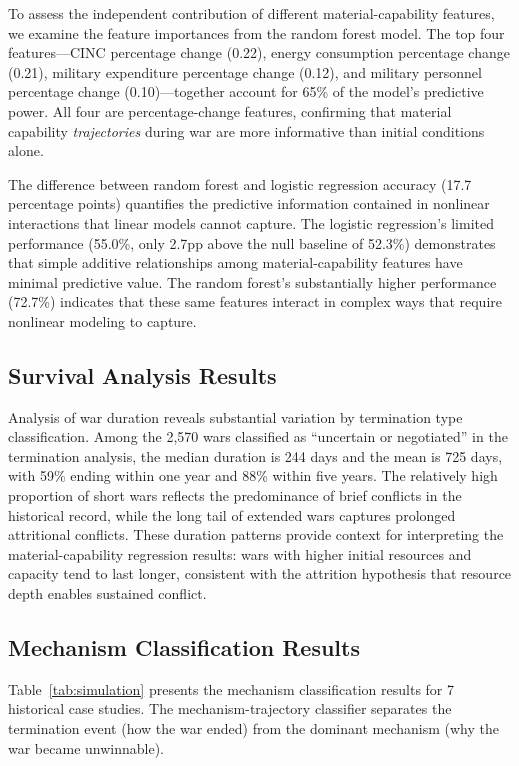 To assess the independent contribution of different material-capability features, we examine the feature importances from the random forest model. The top four features---CINC percentage change (0.22), energy consumption percentage change (0.21), military expenditure percentage change (0.12), and military personnel percentage change (0.10)---together account for 65\% of the model's predictive power. All four are percentage-change features, confirming that material capability \emph{trajectories} during war are more informative than initial conditions alone.

The difference between random forest and logistic regression accuracy (17.7 percentage points) quantifies the predictive information contained in nonlinear interactions that linear models cannot capture. The logistic regression's limited performance (55.0\%, only 2.7pp above the null baseline of 52.3\%) demonstrates that simple additive relationships among material-capability features have minimal predictive value. The random forest's substantially higher performance (72.7\%) indicates that these same features interact in complex ways that require nonlinear modeling to capture.

\subsection{Survival Analysis Results}

Analysis of war duration reveals substantial variation by termination type classification. Among the 2,570 wars classified as ``uncertain or negotiated'' in the termination analysis, the median duration is 244 days and the mean is 725 days, with 59\% ending within one year and 88\% within five years. The relatively high proportion of short wars reflects the predominance of brief conflicts in the historical record, while the long tail of extended wars captures prolonged attritional conflicts. These duration patterns provide context for interpreting the material-capability regression results: wars with higher initial resources and capacity tend to last longer, consistent with the attrition hypothesis that resource depth enables sustained conflict.

\subsection{Mechanism Classification Results}

Table~\ref{tab:simulation} presents the mechanism classification results for 7 historical case studies. The mechanism-trajectory classifier separates the termination event (how the war ended) from the dominant mechanism (why the war became unwinnable).

